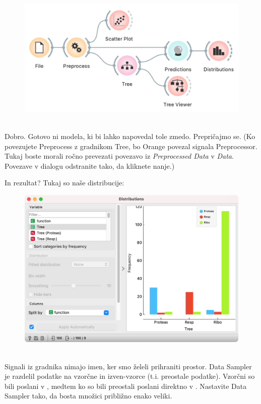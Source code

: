 \begin{figure}
    \includegraphics[scale=0.65]{workflow2.png}
    \caption{$\;$}
\end{figure}

Dobro. Gotovo ni modela, ki bi lahko napovedal tole zmedo. Prepričajmo se. (Ko povezujete Preprocess z gradnikom Tree, bo Orange povezal signala Preprocessor. Tukaj boste morali ročno prevezati povezavo iz \textit{Preprocessed Data} v \textit{Data}. Povezave v dialogu odstranite tako, da kliknete nanje.)

\newpage
\clearpage

In rezultat? Tukaj so naše distribucije:

\begin{figure}[h]
    \includegraphics[width=\linewidth]{distributions1.png}
    \caption{$\;$}
\end{figure}

Signali iz gradnika  nimajo imen, ker smo želeli prihraniti prostor. Data Sampler je razdelil podatke na vzorčne in izven-vzorce (t.i. preostale podatke). Vzorčni so bili poslani v , medtem ko so bili preostali poslani direktno v . Nastavite Data Sampler tako, da bosta množici približno enako veliki.

